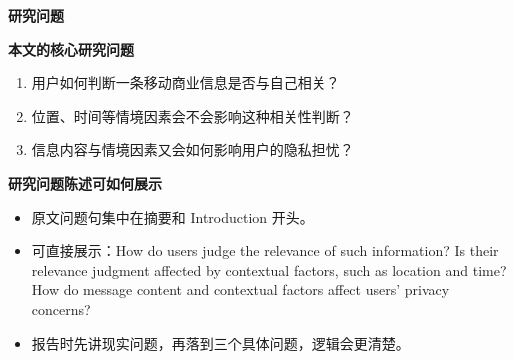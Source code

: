 \documentclass[aspectratio=169,UTF8,zihao=-4]{ctexbeamer}
\newcommand{\bigidea}[1]{
  \begin{center}
    \vspace{0.8em}
    {\LARGE \bfseries #1}
    \vspace{0.6em}
  \end{center}
}
\newcommand{\sectionpageframe}[1]{
  \begin{frame}[plain]
    \begin{center}
      \vfill
      {\Huge \bfseries #1}
      \vfill
    \end{center}
  \end{frame}
}
\begin{document}
\sectionpageframe{研究问题}

\begin{frame}
  \bigidea{本文的核心研究问题}
  \begin{enumerate}
    \item \Large 用户如何判断一条移动商业信息是否与自己相关？
    \item \Large 位置、时间等情境因素会不会影响这种相关性判断？
    \item \Large 信息内容与情境因素又会如何影响用户的隐私担忧？
  \end{enumerate}
\end{frame}

\begin{frame}
  \bigidea{研究问题陈述可如何展示}
  \begin{itemize}
    \item \Large 原文问题句集中在摘要和 Introduction 开头。
    \item \Large 可直接展示：How do users judge the relevance of such information? Is their relevance judgment affected by contextual factors, such as location and time? How do message content and contextual factors affect users' privacy concerns?
    \item \Large 报告时先讲现实问题，再落到三个具体问题，逻辑会更清楚。
  \end{itemize}
\end{frame}
\end{document}
